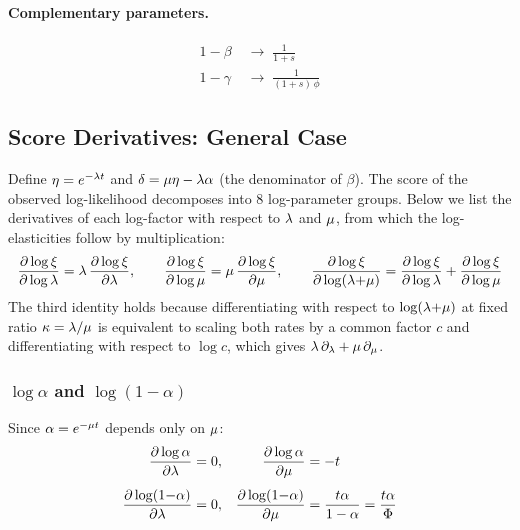 \paragraph{Complementary parameters.}
\begin{align}
1-\beta &\;\to\; \frac{1}{1+s} \label{eq:1mbeta-limit}\\
1-\gamma &\;\to\; \frac{1}{(1+s)\,\phi} \label{eq:1mgamma-limit}
\end{align}


\subsection{Score Derivatives: General Case}
\label{sec:score-general}

Define $\eta = e^{-\lambda t}$ and
$\delta = \mu\eta - \lambda\alpha$
(the denominator of $\beta$).
The score of the observed log-likelihood
decomposes into 8 log-parameter groups.
Below we list the derivatives of each log-factor with respect to
$\lambda$ and $\mu$, from which the log-elasticities follow
by multiplication:
\[
\frac{\partial\log\xi}{\partial\log\lambda}
= \lambda\,\frac{\partial\log\xi}{\partial\lambda}, \qquad
\frac{\partial\log\xi}{\partial\log\mu}
= \mu\,\frac{\partial\log\xi}{\partial\mu}, \qquad
\frac{\partial\log\xi}{\partial\log(\lambda{+}\mu)}
= \frac{\partial\log\xi}{\partial\log\lambda}
+ \frac{\partial\log\xi}{\partial\log\mu}
\]
The third identity holds because differentiating with respect to
$\log(\lambda{+}\mu)$ at fixed ratio $\kappa = \lambda/\mu$
is equivalent to scaling both rates by a common factor $c$ and
differentiating with respect to $\log c$, which gives
$\lambda\,\partial_\lambda + \mu\,\partial_\mu$.

\subsubsection{\texorpdfstring{$\log\alpha$ and $\log(1{-}\alpha)$}{log alpha and log(1-alpha)}}

Since $\alpha = e^{-\mu t}$ depends only on $\mu$:
\begin{align}
\frac{\partial\log\alpha}{\partial\lambda} &= 0, &
\frac{\partial\log\alpha}{\partial\mu} &= -t
\label{eq:dlogalpha}
\\[4pt]
\frac{\partial\log(1{-}\alpha)}{\partial\lambda} &= 0, &
\frac{\partial\log(1{-}\alpha)}{\partial\mu}
  &= \frac{t\alpha}{1-\alpha}
  = \frac{t\alpha}{\Phi}
\label{eq:dlog1malpha}
\end{align}

